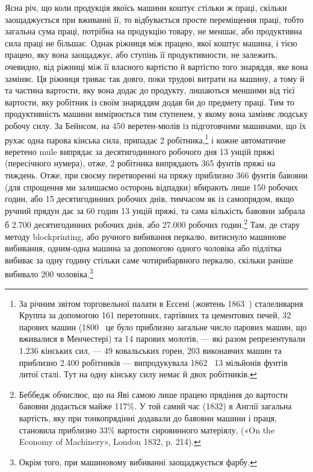 Ясна річ, що коли продукція якоїсь машини коштує стільки ж
праці, скільки заощаджується при вживанні її, то відбувається
просте переміщення праці, тобто загальна сума праці, потрібна
на продукцію товару, не меншає, або продуктивна сила праці не
більшає. Однак ріжниця між працею, якої коштує машина, і
тією працею, яку вона заощаджує, або ступінь її продуктивности,
не залежить, очевидно, від ріжниці між її власного вартістю й
вартістю того знаряддя, яке вона заміняє. Ця ріжниця триває
так довго, поки трудові витрати на машину, а тому й та частина
вартости, яку вона додає до продукту, лишаються меншими від
тієї вартости, яку робітник із своїм знаряддям додав би до предмету
праці. Тим то продуктивність машини вимірюється тим
ступенем, у якому вона заміняє людську робочу силу. За Бейнсом,
на 450 веретен-мюлів із підготовчими машинами, що їх рухає
одна парова кінська сила, припадає 2 робітника,\footnote{
За річним звітом торговельної палати в Ессені (жовтень 1863~)
сталеливарня Круппа за допомогою 161 перетопних, гартівних та цементових
печей, 32 парових машин (1800~ це було приблизно загальне число
парових машин, що вживалися в Менчестері) та 14 парових молотів, —
які разом репрезентували \num{1.236} кінських сил, — 49 ковальських горен,
203 виконавчих машин та приблизно \num{2.400} робітників — випродукувала
1862~ 13 мільйонів фунтів литої сталі. Тут на одну кінську силу немає
й двох робітників.
} і кожне
автоматичне веретено mule випрядає за десятигодинного робочого
дня 13 унцій пряжі (пересічного нумера), отже, 2 робітника
випрядають 365 фунтів пряжі на тиждень. Отже, при своєму
перетворенні на пряжу приблизно 366 фунтів бавовни (для спрощення
ми залишаємо осторонь відпадки) вбирають лише 150 робочих
годин, або 15 десятигодинних робочих днів, тимчасом як із
самопрядом, якщо ручний прядун дає за 60 годин 13 унцій пряжі,
та сама кількість бавовни забрала б \num{2.700} десятигодинних робочих
днів, або \num{27.000} робочих годин.\footnote{
Беббедж обчислює, що на Яві самою лише працею прядіння до
вартости бавовни додається майже 117\%. У той самий час (1832) в Англії
загальна вартість, яку при тонкопрядінні додавали до бавовни машини
і праця, становила приблизно 33\% вартости сировинного матеріялу,
(«On the Economy of Machinery», London 1832, p. 214).
} Там, де стару методу
blockprinting, або ручного вибивання перкалю, витиснуло машинове
вибивання, одним-одна машина за допомогою одного чоловіка
або підлітка вибиває за одну годину стільки саме чотирибарвного
перкалю, скільки раніше вибивало 200 чоловіка.\footnote{
Окрім того, при машиновому вибиванні заощаджується фарбу.
}
\parbreak{}  %
